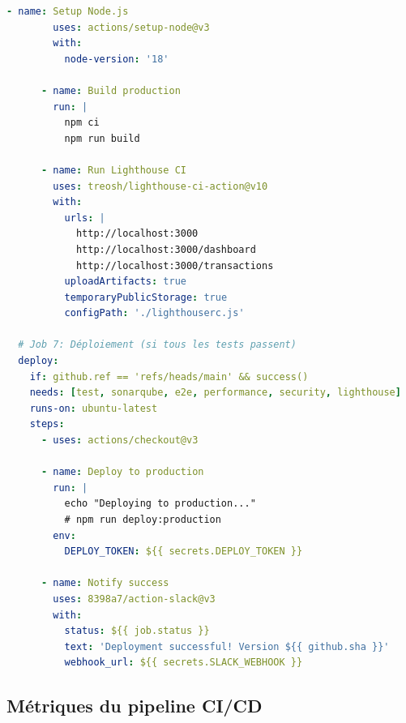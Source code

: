 \begin{exemple}
\begin{lstlisting}[language=yaml]
      - name: Setup Node.js
        uses: actions/setup-node@v3
        with:
          node-version: '18'
      
      - name: Build production
        run: |
          npm ci
          npm run build
      
      - name: Run Lighthouse CI
        uses: treosh/lighthouse-ci-action@v10
        with:
          urls: |
            http://localhost:3000
            http://localhost:3000/dashboard
            http://localhost:3000/transactions
          uploadArtifacts: true
          temporaryPublicStorage: true
          configPath: './lighthouserc.js'

  # Job 7: Déploiement (si tous les tests passent)
  deploy:
    if: github.ref == 'refs/heads/main' && success()
    needs: [test, sonarqube, e2e, performance, security, lighthouse]
    runs-on: ubuntu-latest
    steps:
      - uses: actions/checkout@v3
      
      - name: Deploy to production
        run: |
          echo "Deploying to production..."
          # npm run deploy:production
        env:
          DEPLOY_TOKEN: ${{ secrets.DEPLOY_TOKEN }}
      
      - name: Notify success
        uses: 8398a7/action-slack@v3
        with:
          status: ${{ job.status }}
          text: 'Deployment successful! Version ${{ github.sha }}'
          webhook_url: ${{ secrets.SLACK_WEBHOOK }}
\end{lstlisting}
\end{exemple}

\subsection{Métriques du pipeline CI/CD}

